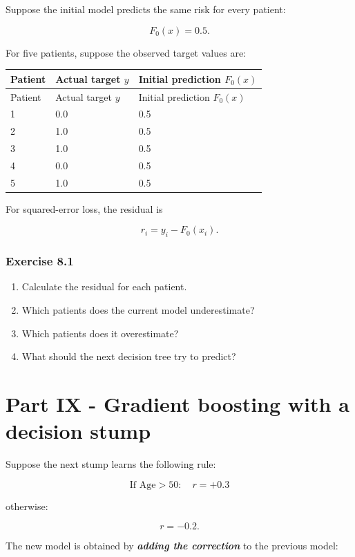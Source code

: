 \documentclass{course_sheet}
\begin{document}
Suppose the initial model predicts the same risk for every patient:

\[
F_0(x)=0.5.
\]

For five patients, suppose the observed target values are:

\begingroup
\small
\setlength{\tabcolsep}{4pt}
\begin{longtable}{l|l|l}
Patient & Actual target $y$ & Initial prediction $F_0(x)$ \\[1.5pt]
\hline
\endfirsthead
Patient & Actual target $y$ & Initial prediction $F_0(x)$ \\[1.5pt]
\hline
\endhead
1 & 0.0 & 0.5 \\[1.5pt]
2 & 1.0 & 0.5 \\[1.5pt]
3 & 1.0 & 0.5 \\[1.5pt]
4 & 0.0 & 0.5 \\[1.5pt]
5 & 1.0 & 0.5 \\[1.5pt]
\end{longtable}
\endgroup
For squared-error loss, the residual is

\[
r_i=y_i-F_0(x_i).
\]

\subsubsection*{Exercise 8.1}
\begin{enumerate}
\item
Calculate the residual for each patient.

\item
Which patients does the current model underestimate?

\item
Which patients does it overestimate?

\item
What should the next decision tree try to predict?

\end{enumerate}
\clearpage
\section*{Part IX - Gradient boosting with a decision stump}
Suppose the next stump learns the following rule:

\[
\text{If Age}>50:
\quad r=+0.3
\]

otherwise:

\[
r=-0.2.
\]

The new model is obtained by \textbf{\textit{adding the correction}} to the previous model:
\end{document}
